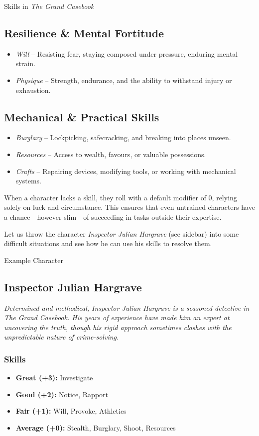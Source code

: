 \begin{DndSidebar}[float=!b]{Skills in \emph{The Grand Casebook}}
\subsection*{Resilience \& Mental Fortitude}  
\begin{itemize}
    \item \emph{Will} – Resisting fear, staying composed under pressure, enduring mental strain.
    \item \emph{Physique} – Strength, endurance, and the ability to withstand injury or exhaustion.
\end{itemize}

\subsection*{Mechanical \& Practical Skills}  
\begin{itemize}
    \item \emph{Burglary} – Lockpicking, safecracking, and breaking into places unseen.
    \item \emph{Resources} – Access to wealth, favours, or valuable possessions.
    \item \emph{Crafts} – Repairing devices, modifying tools, or working with mechanical systems.
\end{itemize}
\end{DndSidebar}

When a character lacks a skill, they roll with a default modifier of 0, relying solely on luck and circumstance. This ensures that even untrained characters have a chance—however slim—of succeeding in tasks outside their expertise.

Let us throw the character \emph{Inspector Julian Hargrave} (see sidebar) into some difficult situations and see how he can use his skills to resolve them.

\begin{DndSidebar}[float=!t]{Example Character}
\subsection{Inspector Julian Hargrave}
\emph{Determined and methodical, Inspector Julian Hargrave is a seasoned detective in The Grand Casebook. His years of experience have made him an expert at uncovering the truth, though his rigid approach sometimes clashes with the unpredictable nature of crime-solving.}
\subsubsection*{Skills}
\begin{itemize}
    \item \textbf{Great (+3):} Investigate
    \item \textbf{Good (+2):} Notice, Rapport
    \item \textbf{Fair (+1):} Will, Provoke, Athletics
    \item \textbf{Average (+0):} Stealth, Burglary, Shoot, Resources
\end{itemize}
\end{DndSidebar}

